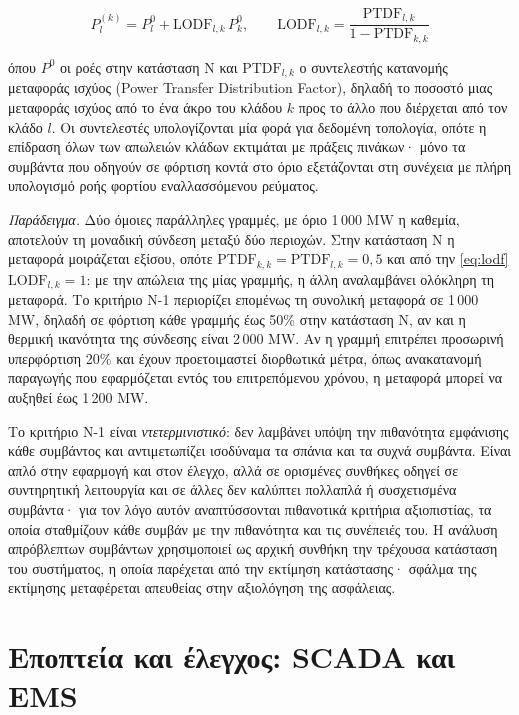 \begin{equation}
P_l^{(k)} = P_l^{0} + \mathrm{LODF}_{l,k}\, P_k^{0}, \qquad
\mathrm{LODF}_{l,k} = \frac{\mathrm{PTDF}_{l,k}}{1 - \mathrm{PTDF}_{k,k}}
\label{eq:lodf}
\end{equation}

όπου $P^{0}$ οι ροές στην κατάσταση N και $\mathrm{PTDF}_{l,k}$ ο συντελεστής κατανομής
μεταφοράς ισχύος (Power Transfer Distribution Factor), δηλαδή το ποσοστό μιας μεταφοράς
ισχύος από το ένα άκρο του κλάδου $k$ προς το άλλο που διέρχεται από τον κλάδο $l$. Οι
συντελεστές υπολογίζονται μία φορά για δεδομένη τοπολογία, οπότε η επίδραση όλων των
απωλειών κλάδων εκτιμάται με πράξεις πινάκων· μόνο τα συμβάντα που οδηγούν σε φόρτιση κοντά
στο όριο εξετάζονται στη συνέχεια με πλήρη υπολογισμό ροής φορτίου εναλλασσόμενου ρεύματος.

\emph{Παράδειγμα.} Δύο όμοιες παράλληλες γραμμές, με όριο 1\,000 MW η καθεμία, αποτελούν τη
μοναδική σύνδεση μεταξύ δύο περιοχών. Στην κατάσταση N η μεταφορά μοιράζεται εξίσου, οπότε
$\mathrm{PTDF}_{k,k} = \mathrm{PTDF}_{l,k} = 0{,}5$ και από την \eqref{eq:lodf}
$\mathrm{LODF}_{l,k} = 1$: με την απώλεια της μίας γραμμής, η άλλη αναλαμβάνει ολόκληρη τη
μεταφορά. Το κριτήριο N-1 περιορίζει επομένως τη συνολική μεταφορά σε 1\,000 MW, δηλαδή σε
φόρτιση κάθε γραμμής έως 50\% στην κατάσταση N, αν και η θερμική ικανότητα της σύνδεσης είναι
2\,000 MW. Αν η γραμμή επιτρέπει προσωρινή υπερφόρτιση 20\% και έχουν προετοιμαστεί
διορθωτικά μέτρα, όπως ανακατανομή παραγωγής που εφαρμόζεται εντός του επιτρεπόμενου χρόνου,
η μεταφορά μπορεί να αυξηθεί έως 1\,200 MW.

Το κριτήριο N-1 είναι \emph{ντετερμινιστικό}: δεν λαμβάνει υπόψη την πιθανότητα εμφάνισης
κάθε συμβάντος και αντιμετωπίζει ισοδύναμα τα σπάνια και τα συχνά συμβάντα. Είναι απλό στην
εφαρμογή και στον έλεγχο, αλλά σε ορισμένες συνθήκες οδηγεί σε συντηρητική λειτουργία και σε
άλλες δεν καλύπτει πολλαπλά ή συσχετισμένα συμβάντα· για τον λόγο αυτόν αναπτύσσονται
πιθανοτικά κριτήρια αξιοπιστίας, τα οποία σταθμίζουν κάθε συμβάν με την πιθανότητα και τις
συνέπειές του. Η ανάλυση απρόβλεπτων συμβάντων χρησιμοποιεί ως αρχική συνθήκη την τρέχουσα
κατάσταση του συστήματος, η οποία παρέχεται από την εκτίμηση κατάστασης· σφάλμα της
εκτίμησης μεταφέρεται απευθείας στην αξιολόγηση της ασφάλειας.

\section{Εποπτεία και έλεγχος: SCADA και EMS}

